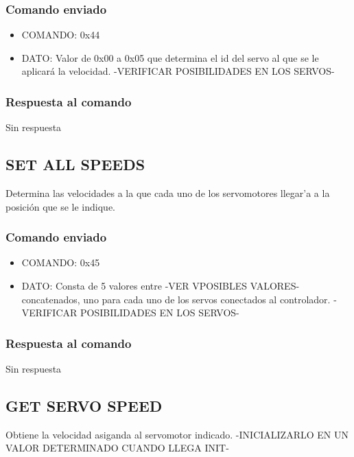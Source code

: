 \documentclass[a4paper,10pt]{article}
\begin{document}
\subsubsection*{Comando enviado}

\begin{itemize}
	\item{COMANDO:} 0x44
	\item{DATO:} Valor de 0x00 a 0x05 que determina el id del servo al que se le aplicar\'a la velocidad.
	-VERIFICAR POSIBILIDADES EN LOS SERVOS-
\end{itemize}

\subsubsection*{Respuesta al comando}

Sin respuesta

\subsection{SET ALL SPEEDS}
\label{set_all_speeds}

Determina las velocidades a la que cada uno de los servomotores llegar'a a la posici\'on que se le indique.

\subsubsection*{Comando enviado}

\begin{itemize}
	\item{COMANDO:} 0x45
	\item{DATO:} Consta de 5 valores entre -VER VPOSIBLES VALORES- concatenados, uno para cada uno de los servos conectados al controlador.
	-VERIFICAR POSIBILIDADES EN LOS SERVOS-
\end{itemize}

\subsubsection*{Respuesta al comando}

Sin respuesta

\subsection{GET SERVO SPEED}
\label{get_servo_speed}

Obtiene la velocidad asiganda al servomotor indicado. -INICIALIZARLO EN UN VALOR DETERMINADO CUANDO LLEGA INIT-
\end{document}
